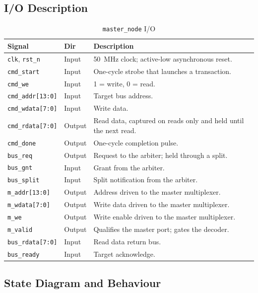 \documentclass[11pt,a4paper]{article}
\newcommand{\sig}[1]{\texttt{#1}}
\begin{document}
\subsection{I/O Description}

\begin{table}[htbp]
\centering
\caption{\sig{master\_node} I/O}
\label{tab:io_master}
\small
\begin{tabularx}{\textwidth}{llX}
\toprule
\textbf{Signal} & \textbf{Dir} & \textbf{Description} \\
\midrule
\sig{clk}, \sig{rst\_n} & Input  & 50~MHz clock; active-low asynchronous reset. \\
\sig{cmd\_start}        & Input  & One-cycle strobe that launches a transaction. \\
\sig{cmd\_we}           & Input  & 1 = write, 0 = read. \\
\sig{cmd\_addr[13:0]}   & Input  & Target bus address. \\
\sig{cmd\_wdata[7:0]}   & Input  & Write data. \\
\sig{cmd\_rdata[7:0]}   & Output & Read data, captured on reads only and held until the next read. \\
\sig{cmd\_done}         & Output & One-cycle completion pulse. \\
\sig{bus\_req}          & Output & Request to the arbiter; held through a split. \\
\sig{bus\_gnt}          & Input  & Grant from the arbiter. \\
\sig{bus\_split}        & Input  & Split notification from the arbiter. \\
\sig{m\_addr[13:0]}     & Output & Address driven to the master multiplexer. \\
\sig{m\_wdata[7:0]}     & Output & Write data driven to the master multiplexer. \\
\sig{m\_we}             & Output & Write enable driven to the master multiplexer. \\
\sig{m\_valid}          & Output & Qualifies the master port; gates the decoder. \\
\sig{bus\_rdata[7:0]}   & Input  & Read data return bus. \\
\sig{bus\_ready}        & Input  & Target acknowledge. \\
\bottomrule
\end{tabularx}
\end{table}

\subsection{State Diagram and Behaviour}
\end{document}
